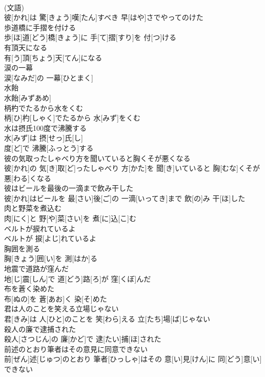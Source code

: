 \documentclass[8pt]{extreport}
\begin{document}
\begin{CJK}{UTF8}{min}
\\	(文語) 
\\	彼[かれ]は 驚[きょう]嘆[たん]すべき 早[はや]さでやってのけた
\\	歩道橋に手摺を付ける	
\\	歩[ほ]道[どう]橋[きょう]に 手[て]摺[すり]を 付[つ]ける
\\	有頂天になる	
\\	有[う]頂[ちょう]天[てん]になる
\\	涙の一幕	
\\	涙[なみだ]の 一幕[ひとまく]
\\	水飴	
\\	水飴[みずあめ]
\\	柄杓でたるから水をくむ	
\\	柄[ひ]杓[しゃく]でたるから 水[みず]をくむ
\\	水は摂氏100度で沸騰する	
\\	水[みず]は 摂[せっ]氏[し] 
\\	度[ど]で 沸騰[ふっとう]する
\\	彼の気取ったしゃべり方を聞いていると胸くそが悪くなる	
\\	彼[かれ]の 気[き]取[ど]ったしゃべり 方[かた]を 聞[き]いていると 胸[むな]くそが 悪[わる]くなる
\\	彼はビールを最後の一滴まで飲み干した	
\\	彼[かれ]はビールを 最[さい]後[ご]の 一滴[いってき]まで 飲[の]み 干[ほ]した
\\	肉と野菜を煮込む	
\\	肉[にく]と 野[や]菜[さい]を 煮[に]込[こ]む
\\	ベルトが捩れているよ	
\\	ベルトが 捩[よじ]れているよ
\\	胸囲を測る	
\\	胸[きょう]囲[い]を 測[はか]る
\\	地震で道路が窪んだ	
\\	地[じ]震[しん]で 道[どう]路[ろ]が 窪[くぼ]んだ
\\	布を蒼く染めた	
\\	布[ぬの]を 蒼[あお]く 染[そ]めた
\\	君は人のことを笑える立場じゃない	
\\	君[きみ]は 人[ひと]のことを 笑[わら]える 立[たち]場[ば]じゃない
\\	殺人の廉で逮捕された	
\\	殺人[さつじん]の 廉[かど]で 逮[たい]捕[ほ]された
\\	前述のとおり筆者はその意見に同意できない	
\\	前[ぜん]述[じゅつ]のとおり 筆者[ひっしゃ]はその 意[い]見[けん]に 同[どう]意[い]できない

\end{CJK}
\end{document}
